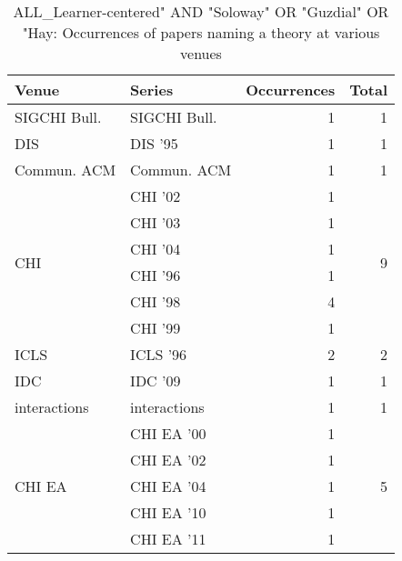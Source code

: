 \begin{table*}[t]
\begin{tabular}{llrr}
Venue & Series & Occurrences & Total\\\hline
\multirow{1}{*}{SIGCHI Bull.} & SIGCHI Bull. & 1 & \multirow{1}{*}{1}\\
\multirow{1}{*}{DIS } & DIS '95 & 1 & \multirow{1}{*}{1}\\
\multirow{1}{*}{Commun. ACM} & Commun. ACM & 1 & \multirow{1}{*}{1}\\
\multirow{6}{*}{CHI } & CHI '02 & 1 & \multirow{6}{*}{9}\\
& CHI '03 & 1 &\\
& CHI '04 & 1 &\\
& CHI '96 & 1 &\\
& CHI '98 & 4 &\\
& CHI '99 & 1 &\\
\multirow{1}{*}{ICLS } & ICLS '96 & 2 & \multirow{1}{*}{2}\\
\multirow{1}{*}{IDC } & IDC '09 & 1 & \multirow{1}{*}{1}\\
\multirow{1}{*}{interactions} & interactions & 1 & \multirow{1}{*}{1}\\
\multirow{5}{*}{CHI EA } & CHI EA '00 & 1 & \multirow{5}{*}{5}\\
& CHI EA '02 & 1 &\\
& CHI EA '04 & 1 &\\
& CHI EA '10 & 1 &\\
& CHI EA '11 & 1 &\\
\end{tabular}
\caption{ALL\_Learner-centered" AND "Soloway" OR "Guzdial" OR "Hay: Occurrences of papers naming a theory at various venues}
\end{table*}